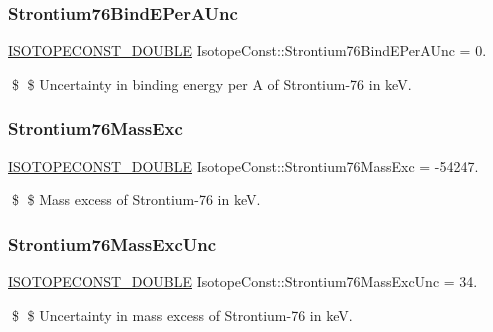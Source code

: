 \subsubsection{\texorpdfstring{Strontium76\+Bind\+E\+Per\+A\+Unc}{Strontium76BindEPerAUnc}}
{\footnotesize\ttfamily \mbox{\hyperlink{group___isotope_const-_macros_ga8f45a7272ce02c0b4c65c44636ed719a}{I\+S\+O\+T\+O\+P\+E\+C\+O\+N\+S\+T\+\_\+\+D\+O\+U\+B\+LE}} Isotope\+Const\+::\+Strontium76\+Bind\+E\+Per\+A\+Unc = 0.}

\$ \$ Uncertainty in binding energy per A of Strontium-\/76 in keV. \mbox{\label{group___isotope_const-_strontium-_sr76_gab93797576a4c642109b5d51aa07d0232}} 
\subsubsection{\texorpdfstring{Strontium76\+Mass\+Exc}{Strontium76MassExc}}
{\footnotesize\ttfamily \mbox{\hyperlink{group___isotope_const-_macros_ga8f45a7272ce02c0b4c65c44636ed719a}{I\+S\+O\+T\+O\+P\+E\+C\+O\+N\+S\+T\+\_\+\+D\+O\+U\+B\+LE}} Isotope\+Const\+::\+Strontium76\+Mass\+Exc = -\/54247.}

\$ \$ Mass excess of Strontium-\/76 in keV. \mbox{\label{group___isotope_const-_strontium-_sr76_gaaa5f817335ed7c5b8432c1092ba0a649}} 
\subsubsection{\texorpdfstring{Strontium76\+Mass\+Exc\+Unc}{Strontium76MassExcUnc}}
{\footnotesize\ttfamily \mbox{\hyperlink{group___isotope_const-_macros_ga8f45a7272ce02c0b4c65c44636ed719a}{I\+S\+O\+T\+O\+P\+E\+C\+O\+N\+S\+T\+\_\+\+D\+O\+U\+B\+LE}} Isotope\+Const\+::\+Strontium76\+Mass\+Exc\+Unc = 34.}

\$ \$ Uncertainty in mass excess of Strontium-\/76 in keV. \mbox{\label{group___isotope_const-_strontium-_sr76_gafd0666c326b2393cd4fda59e8db8002f}} 
